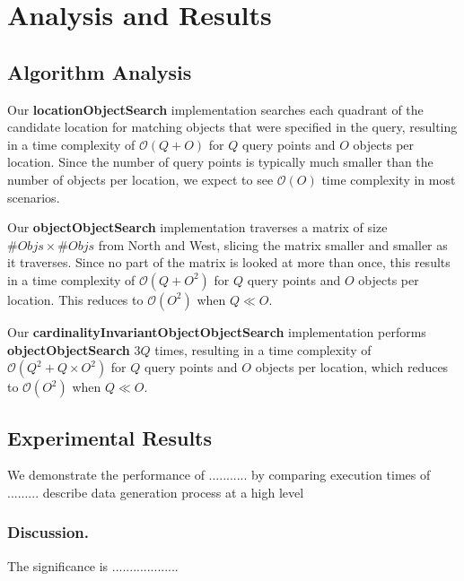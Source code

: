 \section{Analysis and Results}
\label{section:results}


\subsection{Algorithm Analysis}

Our \textbf{locationObjectSearch} implementation searches each quadrant of the candidate location for matching objects that were specified in the query, resulting in a time complexity of $\mathcal{O}(Q + O)$ for $Q$ query points and $O$ objects per location. 
Since the number of query points is typically much smaller than the number of objects per location, we expect to see $\mathcal{O}(O)$ time complexity in most scenarios.

Our \textbf{objectObjectSearch} implementation traverses a matrix of size $\# Objs \times \# Objs$ from North and West, slicing the matrix smaller and smaller as it traverses. 
Since no part of the matrix is looked at more than once, this results in a time complexity of $\mathcal{O}(Q + O^2)$ for $Q$ query points and $O$ objects per location. 
This reduces to $\mathcal{O}(O^2)$ when $Q \ll O$. %

Our \textbf{cardinalityInvariantObjectObjectSearch} implementation performs \textbf{objectObjectSearch} $3Q$ times, resulting in a time complexity of $\mathcal{O}(Q^2 + Q\times O^2)$ for $Q$ query points and $O$ objects per location, which reduces to $\mathcal{O}(O^2)$ when $Q \ll O$. 


\subsection{Experimental Results}
We demonstrate the performance of ........... by comparing execution times of ......... describe data generation process at a high level

\subsubsection{Discussion.} 
The significance is ...................

